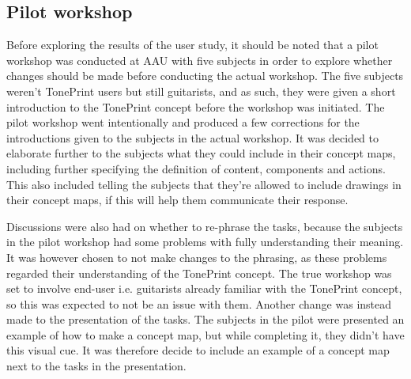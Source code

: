 \subsection{Pilot workshop}
\label{PilotTest}
Before exploring the results of the user study, it should be noted that a pilot workshop was conducted at AAU with five subjects in order to explore whether changes should be made before conducting the actual workshop. The five subjects weren't TonePrint users but still guitarists, and as such, they were given a short introduction to the TonePrint concept before the workshop was initiated. The pilot workshop went intentionally and produced a few corrections for the introductions given to the subjects in the actual workshop. It was decided to elaborate further to the subjects what they could include in their concept maps, including further specifying the definition of content, components and actions. This also included telling the subjects that they're allowed to include drawings in their concept maps, if this will help them communicate their response.

Discussions were also had on whether to re-phrase the tasks, because the subjects in the pilot workshop had some problems with fully understanding their meaning. It was however chosen to not make changes to the phrasing, as these problems regarded their understanding of the TonePrint concept. The true workshop was set to involve end-user i.e. guitarists already familiar with the TonePrint concept, so this was expected to not be an issue with them. Another change was instead made to the presentation of the tasks. The subjects in the pilot were presented an example of how to make a concept map, but while completing it, they didn't have this visual cue. It was therefore decide to include an example of a concept map next to the tasks in the presentation.

